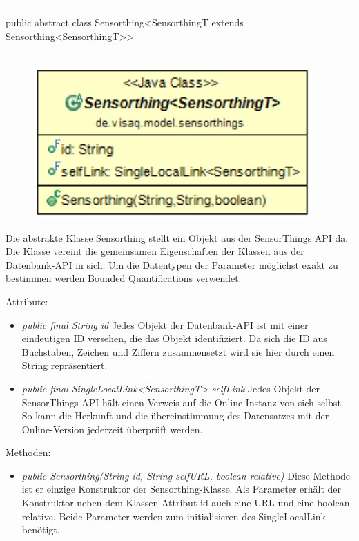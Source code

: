 \rule{\textwidth}{0.4pt}
public abstract class Sensorthing<SensorthingT extends Sensorthing<SensorthingT>>
\\\\
\begin{minipage}{0.4\textwidth}
    \begin{figure}[H]
        {\centering\includegraphics[width=0.95\textwidth]{media/backend/modell/classes/Sensorthing.png}}
    \end{figure}
    \end{minipage} \hfill
    \begin{minipage}{0.6\textwidth}
Die abstrakte Klasse Sensorthing stellt ein Objekt aus der \gls{SensorThings API} da.
Die Klasse vereint die gemeinsamen Eigenschaften der Klassen aus der Datenbank-\gls{API} in sich.
Um die Datentypen der Parameter möglichst exakt zu bestimmen werden \glspl{Bounded Quantification} verwendet.
\end{minipage}

Attribute:
\begin{itemize}
    \item \emph{public final String id} Jedes Objekt der Datenbank-\gls{API} ist mit einer eindeutigen ID versehen, die das Objekt identifiziert.
    Da sich die ID aus Buchstaben, Zeichen und Ziffern zusammensetzt wird sie hier durch einen String repräsentiert.
    \item \emph{public final SingleLocalLink<SensorthingT> selfLink} Jedes Objekt der \gls{SensorThings API} hält einen Verweis auf die Online-Instanz von sich selbst.
    So kann die Herkunft und die übereinstimmung des Datensatzes mit der Online-Version jederzeit überprüft werden.
\end{itemize}
Methoden: \begin{itemize}
    \item \emph{public Sensorthing(String id, String selfURL, boolean relative)} Diese Methode ist er einzige Konstruktor der Sensorthing-Klasse.
    Als Parameter erhält der Konstruktor neben dem Klassen-Attribut id auch eine URL und eine boolean relative. Beide Parameter werden zum initialisieren des SingleLocalLink benötigt.
\end{itemize}

